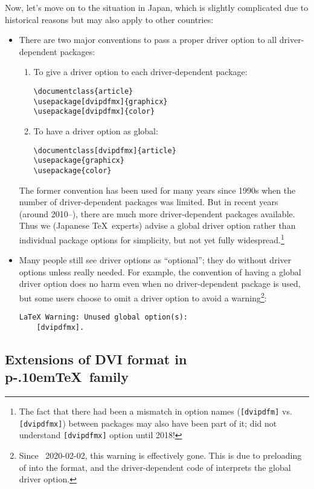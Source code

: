 \documentclass[a4paper,11pt,dvipdfmx]{article}
\def\code#1{\texttt{#1}}
\def\pTeX{p\kern-.10em\TeX}\def\upTeX{u\pTeX}
\begin{document}
Now, let's move on to the situation in Japan,
which is slightly complicated due to historical reasons
but may also apply to other countries:
\begin{itemize}
  \item There are two major conventions to pass a proper driver option
    to all driver-dependent packages:
    \begin{enumerate}
      \item To give a driver option to each driver-dependent package:
\begin{verbatim}
\documentclass{article}
\usepackage[dvipdfmx]{graphicx}
\usepackage[dvipdfmx]{color}
\end{verbatim}
      \item To have a driver option as global:
\begin{verbatim}
\documentclass[dvipdfmx]{article}
\usepackage{graphicx}
\usepackage{color}
\end{verbatim}
    \end{enumerate}
    The former convention has been used for many years since 1990s
    when the number of driver-dependent packages was limited.
    But in recent years (around 2010--), there are much more
    driver-dependent packages available. Thus
    we (Japanese \TeX\ experts) advise a global driver option
    rather than individual package options for simplicity,
    but not yet fully widespread.\footnote{The fact that
    there had been a mismatch in option names
    (\code{[dvipdfm]} vs. \code{[dvipdfmx]})
    between packages may also have been part of it;
     did not understand \code{[dvipdfmx]} option until 2018!}
  \item Many people still see driver options as ``optional'';
    they do without driver options unless really needed.
    For example, the convention of having a global driver option
    does no harm even when no driver-dependent package is used, but
    some users choose to omit a driver option to avoid a warning\footnote{%
    Since \LaTeXe~2020-02-02, this warning is effectively gone. This is due
    to preloading of  into the format, and the driver-dependent
    code of  interprets the global driver option.}:
\begin{verbatim}
LaTeX Warning: Unused global option(s):
    [dvipdfmx].
\end{verbatim}
\end{itemize}

\subsection{Extensions of DVI format in \pTeX\ family}
\end{document}
